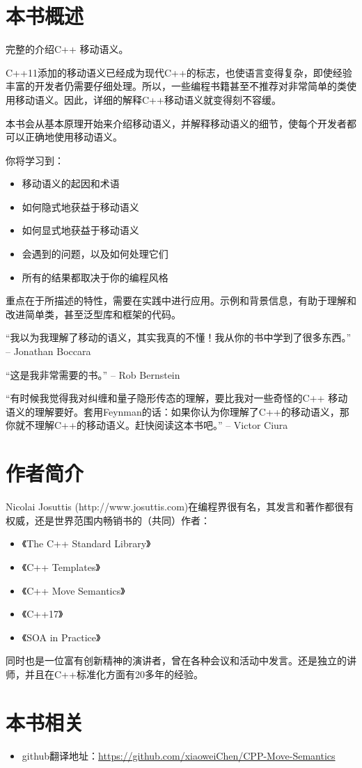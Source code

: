 
\section*{本书概述}

完整的介绍C++ 移动语义。

C++11添加的移动语义已经成为现代C++的标志，也使语言变得复杂，即使经验丰富的开发者仍需要仔细处理。所以，一些编程书籍甚至不推荐对非常简单的类使用移动语义。因此，详细的解释C++移动语义就变得刻不容缓。

本书会从基本原理开始来介绍移动语义，并解释移动语义的细节，使每个开发者都可以正确地使用移动语义。

你将学习到：

\begin{itemize}
    \item 移动语义的起因和术语
    \item 如何隐式地获益于移动语义
    \item 如何显式地获益于移动语义
    \item 会遇到的问题，以及如何处理它们
    \item 所有的结果都取决于你的编程风格
\end{itemize}

重点在于所描述的特性，需要在实践中进行应用。示例和背景信息，有助于理解和改进简单类，甚至泛型库和框架的代码。

“我以为我理解了移动的语义，其实我真的不懂！我从你的书中学到了很多东西。”	-- Jonathan Boccara

“这是我非常需要的书。” -- Rob Bernstein

“有时候我觉得我对纠缠和量子隐形传态的理解，要比我对一些奇怪的C++ 移动语义的理解要好。套用Feynman的话：如果你认为你理解了C++的移动语义，那你就不理解C++的移动语义。赶快阅读这本书吧。”	-- Victor Ciura


\section*{作者简介}
Nicolai Josuttis (http://www.josuttis.com)在编程界很有名，其发言和著作都很有权威，还是世界范围内畅销书的（共同）作者：

\begin{itemize}
    \item 《The C++ Standard Library》
    \item 《C++ Templates》
    \item 《C++ Move Semantics》
    \item 《C++17》
    \item 《SOA in Practice》
\end{itemize}

同时也是一位富有创新精神的演讲者，曾在各种会议和活动中发言。还是独立的讲师，并且在C++标准化方面有20多年的经验。

\section*{本书相关}
\begin{itemize}
    \item github翻译地址：\href{https://github.com/xiaoweiChen/CPP-Move-Semantics}{https://github.com/xiaoweiChen/CPP-Move-Semantics}
\end{itemize}